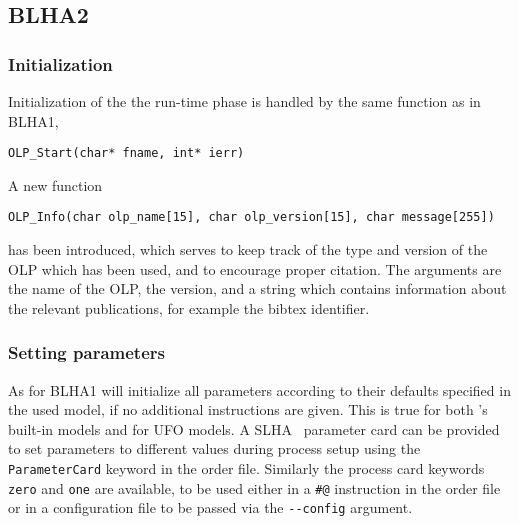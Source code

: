 %
%
%

\subsection{BLHA2}\label{sec:BLHA2_calling}

\subsubsection{Initialization}
Initialization of the the run-time phase is handled by the same function as in BLHA1,
\begin{lstlisting}[style=C]
      OLP_Start(char* fname, int* ierr)
\end{lstlisting}
A new function
\begin{lstlisting}[style=C]
      OLP_Info(char olp_name[15], char olp_version[15], char message[255])
\end{lstlisting}
has been introduced, which serves to keep track of the type and version of the OLP which has been used, and to encourage proper citation. The arguments are the name of the OLP, the version, and a string which contains information about the relevant publications, for example the bibtex identifier.


\subsubsection{Setting parameters}
As for BLHA1 \gosam will initialize all parameters according to their defaults specified in the used model, if no additional instructions are given. This is true for both \gosam's built-in models and for UFO models. A SLHA~\cite{Skands:2003cj,Allanach:2008qq} parameter card can be provided to set parameters to different values during process setup using the \texttt{ParameterCard} keyword in the order file. Similarly the process card keywords \texttt{zero} and \texttt{one} are available, to be used either in a \texttt{\#@} instruction in the order file or in a configuration file to be passed via the \lstinline[style=sh]|--config| argument.\\

